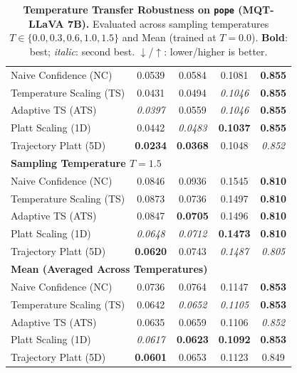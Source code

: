 \begin{table}[t]
{\begin{tabular}{lcccc}
\midrule
Naive Confidence (NC) & 0.0539 & 0.0584 & 0.1081 & \textbf{0.855} \\
Temperature Scaling (TS) & 0.0431 & 0.0494 & \textit{0.1046} & \textbf{0.855} \\
Adaptive TS (ATS) & \textit{0.0397} & 0.0559 & \textit{0.1046} & \textbf{0.855} \\
Platt Scaling (1D) & 0.0442 & \textit{0.0483} & \textbf{0.1037} & \textbf{0.855} \\
Trajectory Platt (5D) & \textbf{0.0234} & \textbf{0.0368} & 0.1048 & \textit{0.852} \\
\midrule
\multicolumn{5}{l}{\textbf{Sampling Temperature $T = 1.5$}} \\
\midrule
Naive Confidence (NC) & 0.0846 & 0.0936 & 0.1545 & \textbf{0.810} \\
Temperature Scaling (TS) & 0.0873 & 0.0736 & 0.1497 & \textbf{0.810} \\
Adaptive TS (ATS) & 0.0847 & \textbf{0.0705} & 0.1496 & \textbf{0.810} \\
Platt Scaling (1D) & \textit{0.0648} & \textit{0.0712} & \textbf{0.1473} & \textbf{0.810} \\
Trajectory Platt (5D) & \textbf{0.0620} & 0.0743 & \textit{0.1487} & \textit{0.805} \\
\midrule
\multicolumn{5}{l}{\textbf{Mean (Averaged Across Temperatures)}} \\
\midrule
Naive Confidence (NC) & 0.0736 & 0.0764 & 0.1147 & \textbf{0.853} \\
Temperature Scaling (TS) & 0.0642 & \textit{0.0652} & \textit{0.1105} & \textbf{0.853} \\
Adaptive TS (ATS) & 0.0635 & 0.0659 & 0.1106 & \textit{0.852} \\
Platt Scaling (1D) & \textit{0.0617} & \textbf{0.0623} & \textbf{0.1092} & \textbf{0.853} \\
Trajectory Platt (5D) & \textbf{0.0601} & 0.0653 & 0.1123 & 0.849 \\
\bottomrule
\end{tabular}%
}
\caption{\textbf{Temperature Transfer Robustness on \texttt{pope} (MQT-LLaVA 7B).} Evaluated across sampling temperatures $T \in \{0.0, 0.3, 0.6, 1.0, 1.5\}$ and Mean (trained at $T=0.0$). \textbf{Bold}: best; \textit{italic}: second best. $\downarrow$/$\uparrow$: lower/higher is better.}
\label{tab:temp_transfer_mqt_pope}
\end{table}

